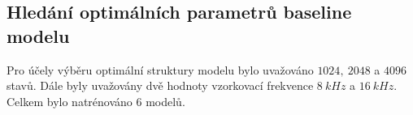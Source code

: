 \subsection{Hledání optimálních parametrů baseline modelu}
\label{chap:construction:results:baseline}


Pro účely výběru optimální struktury modelu bylo uvažováno $1024,\ 2048$ a $4096$ stavů. Dále byly uvažovány dvě hodnoty vzorkovací frekvence $8\ kHz$ a $16\ kHz$. Celkem bylo natrénováno $6$ modelů.


